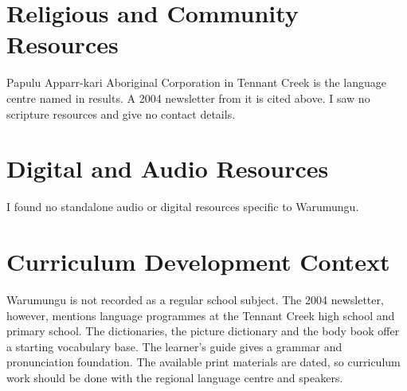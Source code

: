 \documentclass[12pt]{article}
\begin{document}
\section{Religious and Community Resources}
Papulu Apparr-kari Aboriginal Corporation in Tennant Creek is the language centre named in results. A 2004 newsletter from it is cited above. I saw no scripture resources and give no contact details.

\section{Digital and Audio Resources}
I found no standalone audio or digital resources specific to Warumungu.

\section{Curriculum Development Context}
Warumungu is not recorded as a regular school subject. The 2004 newsletter, however, mentions language programmes at the Tennant Creek high school and primary school. The dictionaries, the picture dictionary and the body book offer a starting vocabulary base. The learner's guide gives a grammar and pronunciation foundation. The available print materials are dated, so curriculum work should be done with the regional language centre and speakers.
\end{document}
